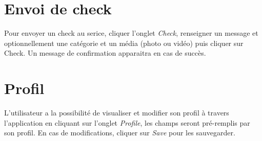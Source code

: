 \documentclass[a4paper,12pt]{report}
\begin{document}
\begin{onehalfspace}
\section{Envoi de check}
Pour envoyer un check au serice, cliquer l'onglet \emph{Check}, renseigner un message et optionnellement une catégorie et un média (photo ou vidéo) puis cliquer sur Check.
Un message de confirmation apparaitra en cas de succès.

\section{Profil}
L'utilisateur a la possibilité de visualiser et modifier son profil à travers l'application en cliquant sur l'onglet \emph{Profile}, les champs seront pré-remplis par son profil. En cas de modifications, cliquer sur \emph{Save} pour les sauvegarder.

  \end{onehalfspace}
\end{document}
